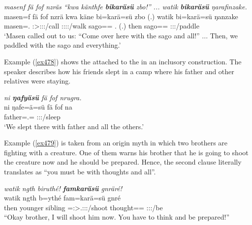 \begin{exe}
	\ex \emph{masenf fä fof nzräs ``kwa känthfe \textbf{bikaräsü} zbo!'' ... watik \textbf{bikaräsü} ŋarafinzake.}\\
	\gll masen=f fä fof nzrä kwa käne bi=karä=sü zbo (.) watik bi=karä=sü ŋanzake\\
	masen=\Erg.{\Sg} {\Dist} {\Emph} \Stsg:\Sbj>\Fpl:\Obj:\Irr:\Pfv/call {\Fut} \Spl:\Sbj:\Imp:\Pfv:\Venit/walk sago=\Prop=\Etc{} \Prox.{\All} (.) then sago=\Prop=\Etc{} \Fpl:\Sbj:\Pst:\Ipfv/paddle\\ 
	\trans `Masen called out to us: ``Come over here with the sago and all!'' ... Then, we paddled with the sago and everything.'
	\label{ex477}
\end{exe}

Example (\ref{ex478}) shows the   attached to the   in an inclusory construction. The speaker describes how his friends slept in a camp where his father and other relatives were staying.

\begin{exe}
	\ex \emph{ni \textbf{ŋafyäsü} fä fof nrugra.}\\
	\gll ni ŋafe=ä=sü fä fof na\\
	{\Fnsg} father=\Assoc.\Pl=\Etc{} {\Dist} {\Emph} \Fpl:\Sbj:\Pst:\Ipfv/sleep\\
	\trans `We slept there with father and all the others.'
	\label{ex478}
\end{exe}
	
Example (\ref{ex479}) is taken from an origin myth in which two brothers are fighting with a creature. One of them warns his brother that he is going to shoot the creature now and he should be prepared. Hence, the second clause literally translates as ``you must be with thoughts and all''.

\begin{exe}
	\ex \emph{watik ngth biruthé! \textbf{famkaräsü} gnräré!}\\
	\gll watik ngth b=ythé fam=karä=sü gnré\\
	then {younger sibling} \Med=\Fsg:\Sbj>\Tsg.\Masc:\Obj:\Nonpast:\Ipfv/shoot thought=\Prop=\Etc{} \Ssg:\Sbj:\Imp:\Ipfv/be\\
	\trans ``Okay brother, I will shoot him now. You have to think and be prepared!''\\
	\label{ex479}
\end{exe}

